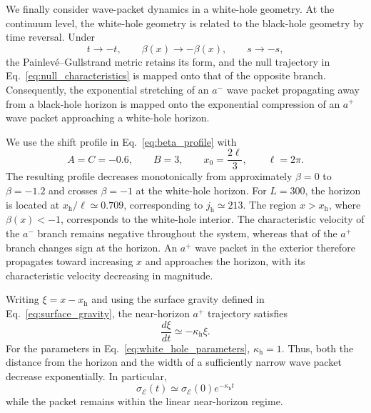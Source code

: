 \documentclass[reprint,amsmath,amssymb,aps,showkeys,superscriptaddress]{revtex4-2}
\begin{document}
We finally consider wave-packet dynamics in a white-hole geometry.
At the continuum level, the white-hole geometry is related to the
black-hole geometry by time reversal. Under
\begin{equation}
  t\rightarrow -t,
  \qquad
  \beta(x)\rightarrow-\beta(x),
  \qquad
  s\rightarrow-s,
  \label{eq:bh_wh_time_reversal}
\end{equation}
the Painlev\'e--Gullstrand metric retains its form, and the null
trajectory in Eq.~\eqref{eq:null_characteristics} is mapped onto
that of the opposite branch. Consequently, the exponential
stretching of an $a^-$ wave packet propagating away from a
black-hole horizon is mapped onto the exponential compression of an
$a^+$ wave packet approaching a white-hole horizon.

We use the shift profile in Eq.~\eqref{eq:beta_profile} with
\begin{equation}
  A=C=-0.6,
  \qquad
  B=3,
  \qquad
  x_0=\frac{2\ell}{3},
  \qquad
  \ell=2\pi.
  \label{eq:white_hole_parameters}
\end{equation}
The resulting profile decreases monotonically from approximately
$\beta=0$ to $\beta=-1.2$ and crosses $\beta=-1$ at the
white-hole horizon. For $L=300$, the horizon is located at
$x_{\mathrm h}/\ell\simeq0.709$, corresponding to
$j_{\mathrm h}\simeq213$. The region $x>x_{\mathrm h}$, where
$\beta(x)<-1$, corresponds to the white-hole interior. The
characteristic velocity of the $a^-$ branch remains negative
throughout the system, whereas that of the $a^+$ branch changes
sign at the horizon. An $a^+$ wave packet in the exterior therefore
propagates toward increasing $x$ and approaches the horizon, with
its characteristic velocity decreasing in magnitude.

Writing $\xi=x-x_{\mathrm h}$ and using the surface gravity defined
in Eq.~\eqref{eq:surface_gravity}, the near-horizon $a^+$
trajectory satisfies
\begin{equation}
  \frac{d\xi}{dt}
  \simeq
  -\kappa_{\mathrm h}\xi.
  \label{eq:white_hole_near_horizon}
\end{equation}
For the parameters in Eq.~\eqref{eq:white_hole_parameters},
$\kappa_{\mathrm h}=1$. Thus, both the distance from the horizon
and the width of a sufficiently narrow wave packet decrease
exponentially. In particular,
\begin{equation}
  \sigma_{\mathcal E}(t)
  \simeq
  \sigma_{\mathcal E}(0)
  e^{-\kappa_{\mathrm h}t}
  \label{eq:white_hole_compression}
\end{equation}
while the packet remains within the linear near-horizon regime.
\end{document}
